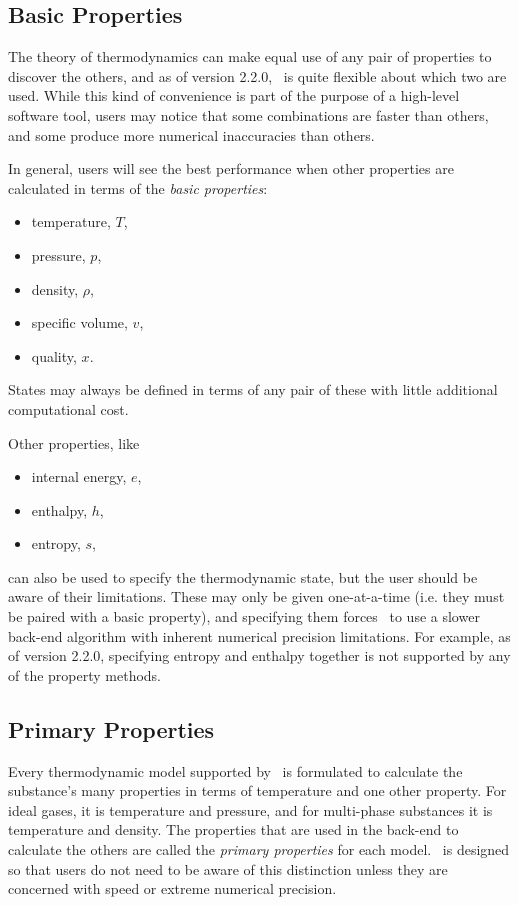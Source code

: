 \subsection{Basic Properties}\label{sec:intro:basic}

The theory of thermodynamics can make equal use of any pair of properties to discover the others, and as of version 2.2.0, \PM\ is quite flexible about which two are used.  While this kind of convenience is part of the purpose of a high-level software tool, users may notice that some combinations are faster than others, and some produce more numerical inaccuracies than others.

In general, users will see the best performance when other properties are calculated in terms of the \emph{basic properties}:
\begin{itemize}
\item temperature, $T$,
\item pressure, $p$,
\item density, $\rho$,
\item specific volume, $v$,
\item quality, $x$.
\end{itemize}
States may always be defined in terms of any pair of these with little additional computational cost.

Other properties, like 
\begin{itemize}
\item internal energy, $e$,
\item enthalpy, $h$, 
\item entropy, $s$,
\end{itemize}
can also be used to specify the thermodynamic state, but the user should be aware of their limitations.  These may only be given one-at-a-time (i.e. they must be paired with a basic property), and specifying them forces \PM\ to use a slower back-end algorithm with inherent numerical precision limitations.  For example, as of version 2.2.0, specifying entropy and enthalpy together is not supported by any of the property methods.  

\subsection{Primary Properties}\label{sec:intro:primary}

Every thermodynamic model supported by \PM\ is formulated to calculate the substance's many properties in terms of temperature and one other property.  For ideal gases, it is temperature and pressure, and for multi-phase substances it is temperature and density.  The properties that are used in the back-end to calculate the others are called the \emph{primary properties} for each model.  \PM\ is designed so that users do not need to be aware of this distinction unless they are concerned with speed or extreme numerical precision.

